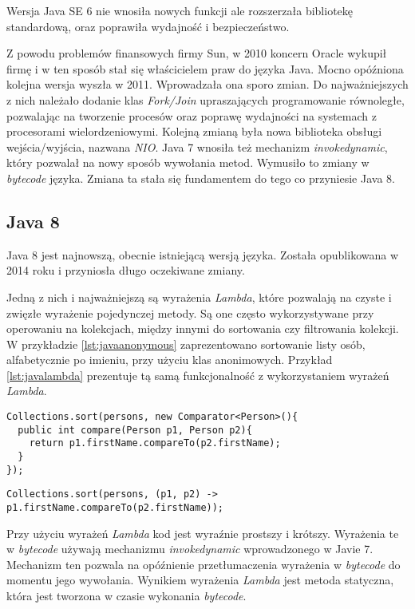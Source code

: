 Wersja Java SE 6 nie wnosiła nowych funkcji ale rozszerzała  bibliotekę standardową, oraz poprawiła wydajność i bezpieczeństwo.

Z powodu problemów finansowych firmy Sun, w 2010 koncern Oracle  wykupił firmę i w ten sposób stał się właścicielem praw do języka Java. Mocno opóźniona kolejna wersja wyszła w 2011. Wprowadzała ona sporo zmian. Do najważniejszych z nich należało dodanie klas \textsl{Fork/Join} upraszających programowanie równoległe, pozwalając na tworzenie procesów oraz poprawę wydajności na systemach z procesorami wielordzeniowymi. Kolejną zmianą była nowa biblioteka obsługi wejścia/wyjścia, nazwana \textsl{NIO}. Java 7 wnosiła też mechanizm \textsl{invokedynamic}, który pozwalał na nowy sposób wywołania metod. Wymusiło to zmiany w \textsl{bytecode} języka. Zmiana ta stała się fundamentem do tego co przyniesie Java 8.

\subsection{Java 8}
Java 8 jest najnowszą, obecnie istniejącą wersją języka. Została opublikowana w 2014 roku i przyniosła długo oczekiwane zmiany.

Jedną z nich i najważniejszą są wyrażenia \textsl{Lambda}, które pozwalają na czyste i zwięzłe wyrażenie pojedynczej metody. Są one często wykorzystywane przy operowaniu na kolekcjach, między innymi do sortowania czy filtrowania kolekcji. W przykładzie \ref{lst:javaanonymous} zaprezentowano sortowanie listy osób, alfabetycznie po imieniu, przy użyciu klas anonimowych. Przykład \ref{lst:javalambda} prezentuje tą samą funkcjonalność z wykorzystaniem wyrażeń \textsl{Lambda}. 

\begin{lstlisting}[caption=Sortowanie kolekcji przy użyciu klas anonimowych, label={lst:javaanonymous}]
Collections.sort(persons, new Comparator<Person>(){
  public int compare(Person p1, Person p2){
    return p1.firstName.compareTo(p2.firstName);
  }
});
\end{lstlisting}

\begin{lstlisting}[caption=Sortowanie kolekcji przy użyciu wyrażeń \textsl{Lambda}, label={lst:javalambda}, aboveskip=0mm]
Collections.sort(persons, (p1, p2) -> p1.firstName.compareTo(p2.firstName));
\end{lstlisting}
 Przy użyciu wyrażeń \textsl{Lambda} kod jest wyraźnie prostszy i krótszy. Wyrażenia te w \textsl{bytecode} używają mechanizmu \textsl{invokedynamic} wprowadzonego w Javie 7. Mechanizm ten pozwala na opóźnienie przetłumaczenia wyrażenia w \textsl{bytecode} do momentu jego wywołania. Wynikiem wyrażenia \textsl{Lambda} jest metoda statyczna, która jest tworzona w czasie wykonania \textsl{bytecode}.


